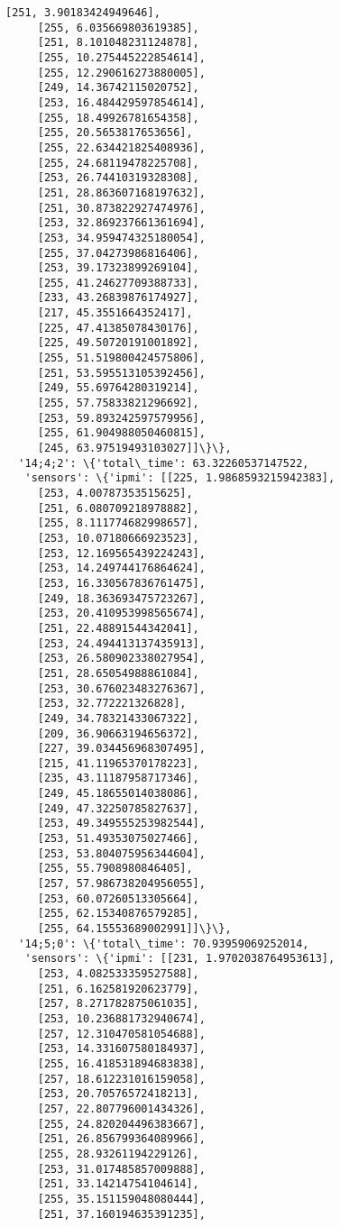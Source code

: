 \documentclass[11pt]{article}
\begin{document}
\begin{tcolorbox}[breakable, size=fbox, boxrule=.5pt, pad at break*=1mm, opacityfill=0]
\begin{Verbatim}[commandchars=\\\{\}]
     [251, 3.90183424949646],
     [255, 6.035669803619385],
     [251, 8.101048231124878],
     [255, 10.275445222854614],
     [255, 12.290616273880005],
     [249, 14.36742115020752],
     [253, 16.484429597854614],
     [255, 18.49926781654358],
     [255, 20.5653817653656],
     [255, 22.634421825408936],
     [255, 24.68119478225708],
     [253, 26.74410319328308],
     [251, 28.863607168197632],
     [251, 30.873822927474976],
     [253, 32.869237661361694],
     [253, 34.959474325180054],
     [255, 37.04273986816406],
     [253, 39.17323899269104],
     [255, 41.24627709388733],
     [233, 43.26839876174927],
     [217, 45.3551664352417],
     [225, 47.41385078430176],
     [225, 49.50720191001892],
     [255, 51.519800424575806],
     [251, 53.595513105392456],
     [249, 55.69764280319214],
     [255, 57.75833821296692],
     [253, 59.893242597579956],
     [255, 61.904988050460815],
     [245, 63.97519493103027]]\}\},
  '14;4;2': \{'total\_time': 63.32260537147522,
   'sensors': \{'ipmi': [[225, 1.9868593215942383],
     [253, 4.00787353515625],
     [251, 6.080709218978882],
     [255, 8.111774682998657],
     [253, 10.07180666923523],
     [253, 12.169565439224243],
     [253, 14.249744176864624],
     [253, 16.330567836761475],
     [249, 18.363693475723267],
     [253, 20.410953998565674],
     [251, 22.48891544342041],
     [253, 24.494413137435913],
     [253, 26.580902338027954],
     [251, 28.65054988861084],
     [253, 30.676023483276367],
     [253, 32.772221326828],
     [249, 34.78321433067322],
     [209, 36.90663194656372],
     [227, 39.034456968307495],
     [215, 41.11965370178223],
     [235, 43.11187958717346],
     [249, 45.18655014038086],
     [249, 47.32250785827637],
     [253, 49.349555253982544],
     [253, 51.49353075027466],
     [253, 53.804075956344604],
     [255, 55.7908980846405],
     [257, 57.986738204956055],
     [253, 60.07260513305664],
     [255, 62.15340876579285],
     [255, 64.15553689002991]]\}\},
  '14;5;0': \{'total\_time': 70.93959069252014,
   'sensors': \{'ipmi': [[231, 1.9702038764953613],
     [253, 4.082533359527588],
     [251, 6.162581920623779],
     [257, 8.271782875061035],
     [253, 10.236881732940674],
     [257, 12.310470581054688],
     [253, 14.331607580184937],
     [255, 16.418531894683838],
     [257, 18.612231016159058],
     [253, 20.70576572418213],
     [257, 22.807796001434326],
     [255, 24.820204496383667],
     [251, 26.856799364089966],
     [255, 28.93261194229126],
     [253, 31.017485857009888],
     [251, 33.14214754104614],
     [255, 35.151159048080444],
     [251, 37.160194635391235],

\end{Verbatim}
\end{tcolorbox}
\end{document}
